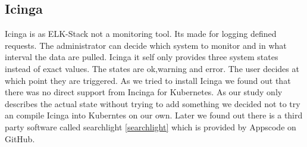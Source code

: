 \subsection{Icinga}
\label{Icinga}
Icinga is as ELK-Stack not a monitoring tool. Its made for logging defined requests. The administrator can decide which system to monitor and in what interval the data are pulled.
Icinga it self only provides three system states instead of exact values. The states are ok,warning and error. The user decides at which point they are triggered.
As we tried to install Icinga we found out that there was no direct support from Incinga for Kubernetes. As our study only describes the actual state without trying to add something we decided not to try an compile Icinga into Kuberntes on our own. Later we found out there is a third party software called searchlight \ref{searchlight} which is provided by Appscode on GitHub.
 